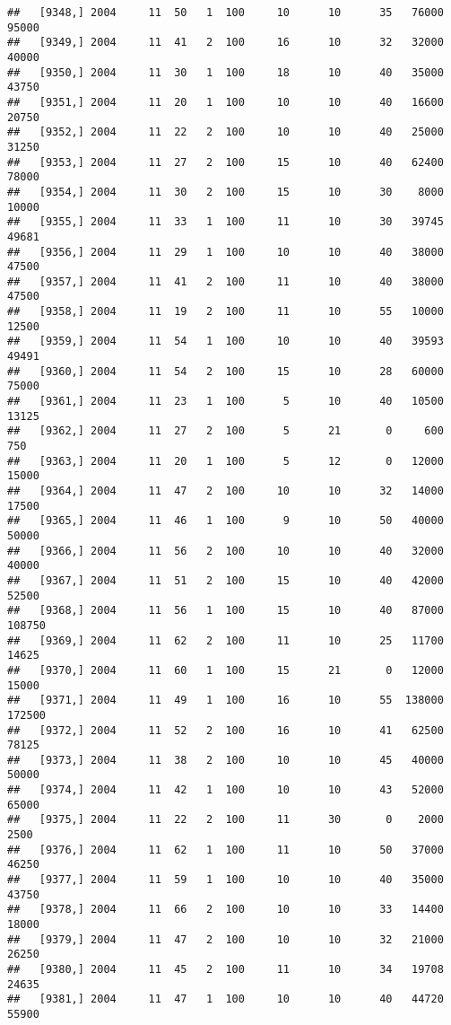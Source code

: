 \documentclass{article}\usepackage[]{graphicx}\usepackage[]{color}
\makeatletter
\newenvironment{kframe}{%
 \def\at@end@of@kframe{}%
 \ifinner\ifhmode%
  \def\at@end@of@kframe{\end{minipage}}%
  \begin{minipage}{\columnwidth}%
 \fi\fi%
 \def\FrameCommand##1{\hskip\@totalleftmargin \hskip-\fboxsep
 \colorbox{shadecolor}{##1}\hskip-\fboxsep
     \hskip-\linewidth \hskip-\@totalleftmargin \hskip\columnwidth}%
 \MakeFramed {\advance\hsize-\width
   \@totalleftmargin\z@ \linewidth\hsize
   \@setminipage}}%
 {\par\unskip\endMakeFramed%
 \at@end@of@kframe}
\newenvironment{knitrout}{}{} %
\makeatother
\begin{document}
\begin{knitrout}
\begin{kframe}
\begin{verbatim}
##   [9348,] 2004     11  50   1  100     10      10      35   76000   95000
##   [9349,] 2004     11  41   2  100     16      10      32   32000   40000
##   [9350,] 2004     11  30   1  100     18      10      40   35000   43750
##   [9351,] 2004     11  20   1  100     10      10      40   16600   20750
##   [9352,] 2004     11  22   2  100     10      10      40   25000   31250
##   [9353,] 2004     11  27   2  100     15      10      40   62400   78000
##   [9354,] 2004     11  30   2  100     15      10      30    8000   10000
##   [9355,] 2004     11  33   1  100     11      10      30   39745   49681
##   [9356,] 2004     11  29   1  100     10      10      40   38000   47500
##   [9357,] 2004     11  41   2  100     11      10      40   38000   47500
##   [9358,] 2004     11  19   2  100     11      10      55   10000   12500
##   [9359,] 2004     11  54   1  100     10      10      40   39593   49491
##   [9360,] 2004     11  54   2  100     15      10      28   60000   75000
##   [9361,] 2004     11  23   1  100      5      10      40   10500   13125
##   [9362,] 2004     11  27   2  100      5      21       0     600     750
##   [9363,] 2004     11  20   1  100      5      12       0   12000   15000
##   [9364,] 2004     11  47   2  100     10      10      32   14000   17500
##   [9365,] 2004     11  46   1  100      9      10      50   40000   50000
##   [9366,] 2004     11  56   2  100     10      10      40   32000   40000
##   [9367,] 2004     11  51   2  100     15      10      40   42000   52500
##   [9368,] 2004     11  56   1  100     15      10      40   87000  108750
##   [9369,] 2004     11  62   2  100     11      10      25   11700   14625
##   [9370,] 2004     11  60   1  100     15      21       0   12000   15000
##   [9371,] 2004     11  49   1  100     16      10      55  138000  172500
##   [9372,] 2004     11  52   2  100     16      10      41   62500   78125
##   [9373,] 2004     11  38   2  100     10      10      45   40000   50000
##   [9374,] 2004     11  42   1  100     10      10      43   52000   65000
##   [9375,] 2004     11  22   2  100     11      30       0    2000    2500
##   [9376,] 2004     11  62   1  100     11      10      50   37000   46250
##   [9377,] 2004     11  59   1  100     10      10      40   35000   43750
##   [9378,] 2004     11  66   2  100     10      10      33   14400   18000
##   [9379,] 2004     11  47   2  100     10      10      32   21000   26250
##   [9380,] 2004     11  45   2  100     11      10      34   19708   24635
##   [9381,] 2004     11  47   1  100     10      10      40   44720   55900

\end{verbatim}
\end{kframe}
\end{knitrout}
\end{document}
